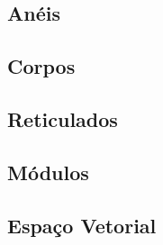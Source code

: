 \documentclass[twoside]{amsart}
\numberwithin{equation}{section}
\begin{document}
\begin{refsection}
\section{Anéis}

\printbibliography[heading=subbibliography]
\end{refsection}


\begin{refsection}
\section{Corpos}

\printbibliography[heading=subbibliography]
\end{refsection}


\begin{refsection}
\section{Reticulados}

\printbibliography[heading=subbibliography]
\end{refsection}


\begin{refsection}
\section{Módulos}

\printbibliography[heading=subbibliography]
\end{refsection}


\begin{refsection}
\section{Espaço Vetorial}

\printbibliography[heading=subbibliography]
\end{refsection}

\end{document}
